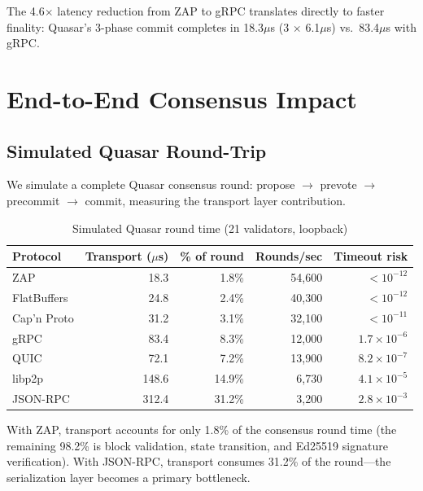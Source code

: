 \documentclass[11pt,letterpaper]{article}
\begin{document}
The 4.6$\times$ latency reduction from ZAP to gRPC translates directly to faster finality: Quasar's 3-phase commit completes in 18.3$\mu$s (3 $\times$ 6.1$\mu$s) vs.\ 83.4$\mu$s with gRPC.

\section{End-to-End Consensus Impact}

\subsection{Simulated Quasar Round-Trip}

We simulate a complete Quasar consensus round: propose $\rightarrow$ prevote $\rightarrow$ precommit $\rightarrow$ commit, measuring the transport layer contribution.

\begin{table}[h]
\centering
\caption{Simulated Quasar round time (21 validators, loopback)}
\label{tab:consensus}
\begin{tabular}{lrrrr}
\toprule
\textbf{Protocol} & \textbf{Transport ($\mu$s)} & \textbf{\% of round} & \textbf{Rounds/sec} & \textbf{Timeout risk} \\
\midrule
\rowcolor{luxblue!10}
ZAP & 18.3 & 1.8\% & 54,600 & $<10^{-12}$ \\
FlatBuffers & 24.8 & 2.4\% & 40,300 & $<10^{-12}$ \\
Cap'n Proto & 31.2 & 3.1\% & 32,100 & $<10^{-11}$ \\
gRPC & 83.4 & 8.3\% & 12,000 & $1.7 \times 10^{-6}$ \\
QUIC & 72.1 & 7.2\% & 13,900 & $8.2 \times 10^{-7}$ \\
libp2p & 148.6 & 14.9\% & 6,730 & $4.1 \times 10^{-5}$ \\
JSON-RPC & 312.4 & 31.2\% & 3,200 & $2.8 \times 10^{-3}$ \\
\bottomrule
\end{tabular}
\end{table}

With ZAP, transport accounts for only 1.8\% of the consensus round time (the remaining 98.2\% is block validation, state transition, and Ed25519 signature verification). With JSON-RPC, transport consumes 31.2\% of the round---the serialization layer becomes a primary bottleneck.
\end{document}
